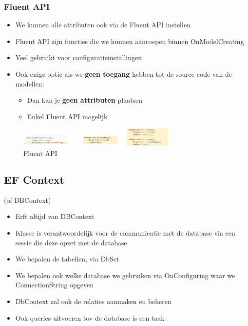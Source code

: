 \documentclass{article}
\begin{document}
\subsubsection{Fluent API}

\begin{itemize}
    \item We kunnen alle attributen ook via de Fluent API instellen
    \item Fluent API zijn functies die we kunnen aanroepen binnen OnModelCreating   
    \item Veel gebruikt voor configuratieinstallingen
    \item Ook enige optie als we \textbf{geen toegang} hebben tot de source code van de modellen:
    \begin{itemize}
        \item Dan kan je \textbf{geen attributen} plaatsen
        \item Enkel Fluent API mogelijk
    \end{itemize}
\end{itemize}

\begin{figure}[H]
    \centering
    \includegraphics[width=0.7\textwidth]{efcore-fluentapi.png}
    \caption{Fluent API}
\end{figure}

\subsection{EF Context}

(of DBContext)

\begin{itemize}
    \item Erft altijd van DBContext
    \item Klasse is verantwoordelijk voor de communicatie met de database via een sessie die deze opzet met de database
    \item We bepalen de tabellen, via DbSet
    \item We bepalen ook welke database we gebruiken via OnConfiguring waar we ConnectionString opgeven
    \item DbContext zal ook de relaties aanmaken en beheren
    \item Ook queries uitvoeren tov de database is een taak
\end{itemize}
\end{document}

